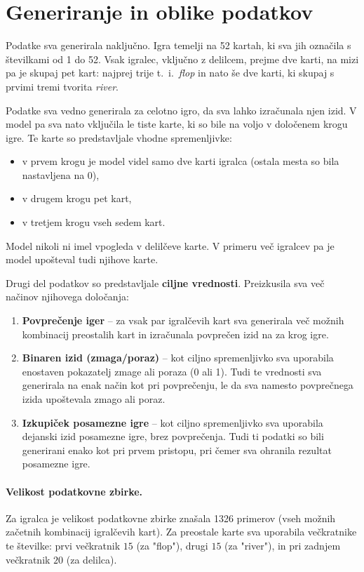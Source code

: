 \documentclass[a4paper,12pt]{article}
\begin{document}
\section{Generiranje in oblike podatkov}

Podatke sva generirala naključno. Igra temelji na 52 kartah, ki sva jih označila s številkami od 1 do 52. 
Vsak igralec, vključno z delilcem, prejme dve karti, na mizi pa je skupaj pet kart: najprej trije t.~i.~\textit{flop} 
in nato še dve karti, ki skupaj s prvimi tremi tvorita \textit{river}.

Podatke sva vedno generirala za celotno igro, da sva lahko izračunala njen izid. V model pa sva nato vključila le tiste karte, 
ki so bile na voljo v določenem krogu igre. Te karte so predstavljale vhodne spremenljivke:
\begin{itemize}
    \item v prvem krogu je model videl samo dve karti igralca (ostala mesta so bila nastavljena na 0),
    \item v drugem krogu pet kart,
    \item v tretjem krogu vseh sedem kart.
\end{itemize}

Model nikoli ni imel vpogleda v delilčeve karte. V primeru več igralcev pa je model upošteval tudi njihove karte.

Drugi del podatkov so predstavljale \textbf{ciljne vrednosti}. Preizkusila sva več načinov njihovega določanja:
\begin{enumerate}
    \item \textbf{Povprečenje iger} -- za vsak par igralčevih kart sva generirala več možnih kombinacij preostalih kart in izračunala povprečen izid na 
    za krog igre. 
    \item \textbf{Binaren izid (zmaga/poraz)} -- kot ciljno spremenljivko sva uporabila enostaven pokazatelj zmage ali poraza (0 ali 1). 
    Tudi te vrednosti sva generirala na enak način kot pri povprečenju, le da sva namesto povprečnega izida upoštevala zmago ali poraz.
    \item \textbf{Izkupiček posamezne igre} -- kot ciljno spremenljivko sva uporabila dejanski izid posamezne igre, brez povprečenja. 
    Tudi ti podatki so bili generirani enako kot pri prvem pristopu, pri čemer sva ohranila rezultat posamezne igre.
\end{enumerate}

\paragraph{Velikost podatkovne zbirke.}
Za igralca je velikost podatkovne zbirke znašala 1326 primerov (vseh možnih začetnih kombinacij igralčevih kart). 
Za preostale karte sva uporabila večkratnike te številke: prvi večkratnik $15$ (za "flop"), drugi $15$ (za "river"), 
in pri zadnjem večkratnik $20$ (za delilca). 
\end{document}
